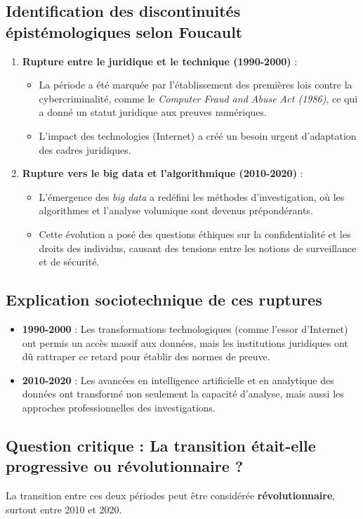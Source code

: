 \documentclass{article}
\begin{document}
\subsection{Identification des discontinuités épistémologiques selon Foucault}
\begin{enumerate}
    \item \textbf{Rupture entre le juridique et le technique (1990-2000)} :
    \begin{itemize}
        \item La période a été marquée par l'établissement des premières lois contre la cybercriminalité, comme le \textit{Computer Fraud and Abuse Act (1986)}, ce qui a donné un statut juridique aux preuves numériques.
        \item L'impact des technologies (Internet) a créé un besoin urgent d'adaptation des cadres juridiques.
    \end{itemize}
    \item \textbf{Rupture vers le big data et l’algorithmique (2010-2020)} :
    \begin{itemize}
        \item L'émergence des \textit{big data} a redéfini les méthodes d'investigation, où les algorithmes et l'analyse volumique sont devenus prépondérants.
        \item Cette évolution a posé des questions éthiques sur la confidentialité et les droits des individus, causant des tensions entre les notions de surveillance et de sécurité.
    \end{itemize}
\end{enumerate}

\subsection{Explication sociotechnique de ces ruptures}
\begin{itemize}
    \item \textbf{1990-2000} : Les transformations technologiques (comme l'essor d'Internet) ont permis un accès massif aux données, mais les institutions juridiques ont dû rattraper ce retard pour établir des normes de preuve.
    \item \textbf{2010-2020} : Les avancées en intelligence artificielle et en analytique des données ont transformé non seulement la capacité d'analyse, mais aussi les approches professionnelles des investigations.
\end{itemize}

\subsection{Question critique : La transition était-elle progressive ou révolutionnaire ?}
La transition entre ces deux périodes peut être considérée \textbf{révolutionnaire}, surtout entre 2010 et 2020.
\end{document}
